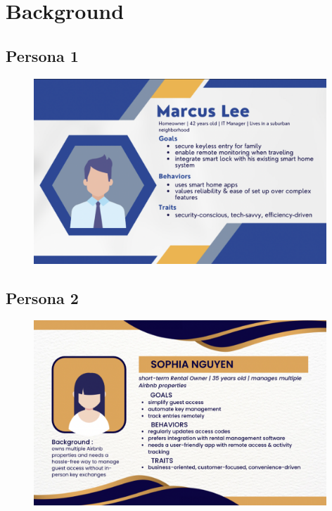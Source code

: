 \section{Background}

\subsection*{Persona 1}
\begin{figure}[!ht]
    \centering
    \includegraphics[width=110mm,scale=0.4]{./img/Persona1.png}
    \label{fig:enter-label}
\end{figure}

\subsection*{Persona 2}
\begin{figure}[!ht]
    \centering
    \includegraphics[width=110mm,scale=0.4]{./img/Persona2.png}
    \label{fig:enter-label}
\end{figure}
\newpage
